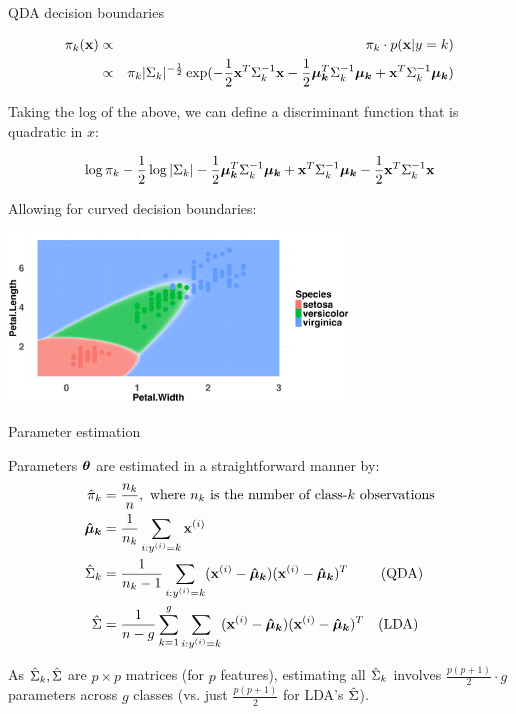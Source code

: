 \documentclass[11pt,compress,t,notes=noshow, xcolor=table]{beamer}
\begin{document}
\begin{vbframe}{QDA decision boundaries}

\vspace{-2em}
\begin{small}
\begin{eqnarray*}
\pi_{k}(\mathbf{x}) &\propto& \pi_{k} \cdot p(\mathbf{x} | y= k) \\
&\propto& \pi_{k} |\Sigma_k|^{-\frac{1}{2}}\exp(- \frac{1}{2} \mathbf{x}^T\Sigma_k^{-1}\mathbf{x} - \frac{1}{2} \bm{\mu_{k}}^T \Sigma_k^{-1} \bm{\mu_{k}} + \mathbf{x}^T \Sigma_k^{-1} \bm{\mu_{k}} )
\end{eqnarray*}

Taking the log of the above, we can define a discriminant function that is quadratic in $x$:

$$ \log \pi_{k} - \frac{1}{2} \log |\Sigma_k| - \frac{1}{2} \bm{\mu_{k}}^T \Sigma_k^{-1} \bm{\mu_{k}} + \mathbf{x}^T \Sigma_k^{-1} \bm{\mu_{k}} - \frac{1}{2} \mathbf{x}^T\Sigma_k^{-1}\mathbf{x} $$


Allowing for curved decision boundaries:

\vspace{-0.5em}
\begin{center}
\includegraphics[width=0.68\textwidth, clip=true, trim={0 0 0 20}]{figure/disc_db-qda.png}
\end{center}
\end{small}

\end{vbframe}

\begin{vbframe}{Parameter estimation}

Parameters $\bm{\theta}$ are estimated in a straightforward manner by:\\
\begin{equation*}
\begin{aligned}
\hat{\pi}_{k} &= \frac{n_k}{n},\text{ where $n_k$ is the number of class-$k$ observations} \\
\bm{\hat{\mu}_{k}} &= \frac{1}{n_k}\sum_{i:y^{(i)} = k} \mathbf{x}^{(i)} \\
\hat \Sigma_k &= \frac{1}{n_k - 1} \sum_{i: y^{(i)} = k} (\mathbf{x}^{(i)} - \bm{\hat{\mu}_{k}}) (\mathbf{x}^{(i)} - \bm{\hat{\mu}_{k}})^T \quad \quad \text{   (QDA)} \\
\hat \Sigma &= \frac{1}{n - g} \sum\limits_{k=1}^g \sum_{i: y^{(i)} = k} (\mathbf{x}^{(i)} - \bm{\hat{\mu}_{k}}) (\mathbf{x}^{(i)} - \bm{\hat{\mu}_{k}})^T \quad \text{(LDA)} \\
\end{aligned}
\end{equation*}

\lz

As $\hat \Sigma_k, \hat \Sigma$ are $p \times p$ matrices (for $p$ features), estimating all $\hat \Sigma_k$ involves $\frac{p(p+1)}{2} \cdot g$ parameters across $g$ classes (vs. just $\frac{p(p+1)}{2}$ for LDA's $\hat \Sigma$).
\end{vbframe}
\end{document}
